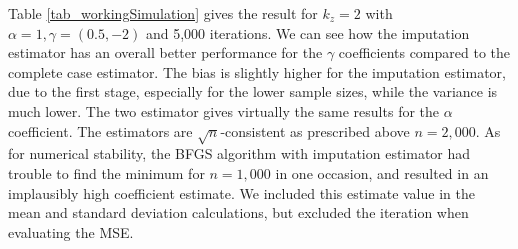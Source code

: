 \documentclass{article}
\theoremstyle{definition}
\theoremstyle{remark}
\begin{document}
Table \ref{tab_workingSimulation} gives the result for $k_z=2$ with $\alpha=1, \gamma = (0.5, -2)$ and 5,000 iterations. We can see how the imputation estimator has an overall better performance for the $\gamma$ coefficients compared to the complete case estimator. The bias is slightly higher for the imputation estimator, due to the first stage, especially for the lower sample sizes, while the variance is much lower. The two estimator gives virtually the same results for the $\alpha$ coefficient. The estimators are $\sqrt{n}$-consistent as prescribed above $n=2,000$. As for numerical stability, the BFGS algorithm with imputation estimator had trouble to find the minimum for $n=1,000$ in one occasion, and resulted in an implausibly high coefficient estimate. {\color{red} We included this estimate value in the mean and standard deviation calculations, but excluded the iteration when evaluating the MSE.}
\end{document}
